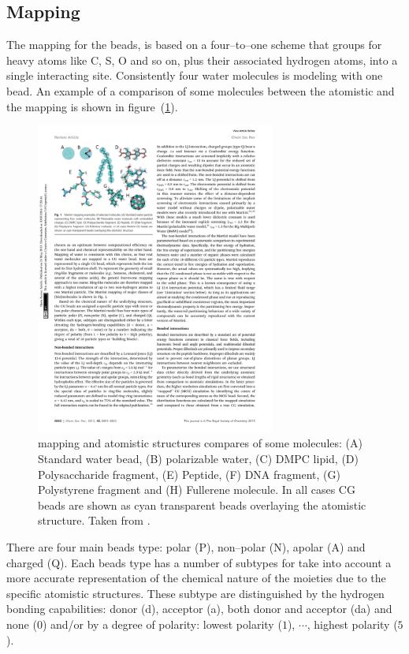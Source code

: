 \subsection{Mapping}
The mapping for the \martini beads, is based on a four--to--one scheme that groups for heavy atoms like C, S, O and so on, plus their associated hydrogen atoms, into a single interacting site. Consistently four water molecules is modeling with one \martini bead. An example of a comparison of some molecules between the atomistic and the \martini mapping is shown in figure~(\ref{fig:martiniMapping}).
\begin{figure}[!ht]
	\centering
	\includegraphics[width=0.7\textwidth]{img/martiniMapping.pdf}
	\caption{\martini mapping and atomistic structures compares of some molecules: (A) Standard water bead, (B) polarizable water, (C) \acs{DMPC} lipid, (D) Polysaccharide fragment, (E) Peptide, (F) \acs{DNA} fragment, (G) Polystyrene fragment and (H) Fullerene molecule. In all cases \martini \acs{CG} beads are shown as cyan transparent beads overlaying the atomistic structure. Taken from \cite{MartiniReview}.}
	\label{fig:martiniMapping}
\end{figure}
There are four main beads type: polar (P), non--polar (N), apolar (A) and charged (Q). Each beads type has a number of subtypes for take into account a more accurate representation of the chemical nature of the moieties due to the specific atomistic structures. These subtype are distinguished by the hydrogen bonding capabilities: donor (d), acceptor (a), both donor and acceptor (da) and none ($0$) and/or by a degree of polarity: lowest polarity ($1$), $\cdots$, highest polarity ($5$).

